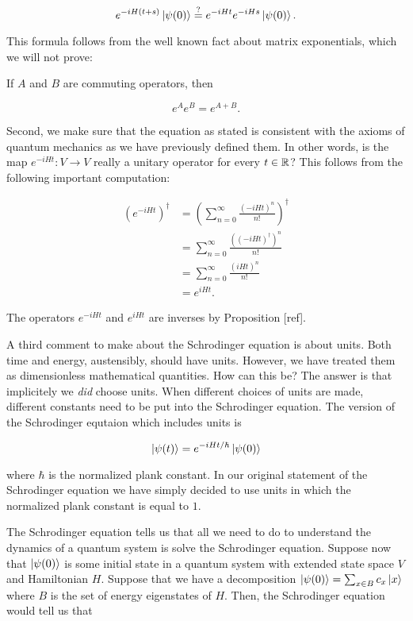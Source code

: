 $$e^{-i H (t+s)}\ket{\psi(0)}\stackrel{?}{=}e^{- i H t} e^{- i H s}\ket{\psi(0)}.$$

This formula follows from the well known fact about matrix exponentials, which we will not prove:

\begin{proposition} If $A$ and $B$ are commuting operators, then

$$e^{A}e^{B}=e^{A+B}.$$
\end{proposition}

Second, we make sure that the equation as stated is consistent with the axioms of quantum mechanics as we have previously defined them. In other words, is the map $e^{-iHt}: V\to V$ really a unitary operator for every $t\in \mathbb{R}$? This follows from the following important computation:

\begin{align*}
\left(e^{-iHt}\right)^\dagger &= \left(\sum_{n=0}^{\infty}\frac{(-i H t)^n}{n!}\right)^{\dagger}\\
&= \sum_{n=0}^{\infty}\frac{\left((-i H t)^\dagger\right)^n}{n!}\\
&= \sum_{n=0}^{\infty}\frac{\left(i H t\right)^n}{n!}\\
&=e^{i H t}.
\end{align*}

The operators $e^{- i H t}$ and $e^{i H t}$ are inverses by Proposition [ref].

A third comment to make about the Schrodinger equation is about units. Both time and energy, austensibly, should have units. However, we have treated them as dimensionless mathematical quantities. How can this be? The answer is that implicitely we \textit{did} choose units. When different choices of units are made, different constants need to be put into the Schrodinger equation. The version of the Schrodinger equtaion which includes units is

$$\ket{\psi(t)}=e^{-i H t/\hbar}\ket{\psi(0)}$$

where $\hbar$ is the normalized plank constant. In our original statement of the Schrodinger equation we have simply decided to use units in which the normalized plank constant is equal to $1$.

The Schrodinger equation tells us that all we need to do to understand the dynamics of a quantum system is solve the Schrodinger equation. Suppose now that $\ket{\psi(0)}$ is some initial state in a quantum system with extended state space $V$ and Hamiltonian $H$. Suppose that we have a decomposition $\ket{\psi(0)}=\sum_{x\in B}c_x \ket{x}$ where $B$ is the set of energy eigenstates of $H$. Then, the Schrodinger equation would tell us that

